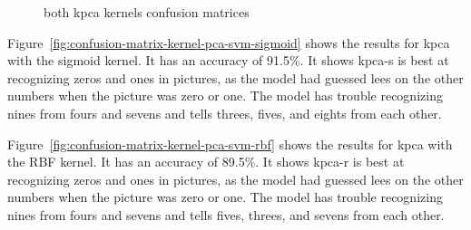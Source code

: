 \begin{figure}
    \centering
    \qquad
    \caption{both \gls{kpca} kernels confusion matrices}
    \label{fig:kpca-kernels}
\end{figure}

Figure~\ref{fig:confusion-matrix-kernel-pca-svm-sigmoid} shows the results for \gls{kpca} with the sigmoid kernel. It has an accuracy of 91.5\%. It shows \gls{kpca-s} is best at recognizing zeros and ones in pictures, as the model had guessed lees on the other numbers when the picture was zero or one. The model has trouble recognizing nines from fours and sevens and tells threes, fives, and eights from each other.

Figure~\ref{fig:confusion-matrix-kernel-pca-svm-rbf} shows the results for \gls{kpca} with the RBF kernel. It has an accuracy of 89.5\%. It shows \gls{kpca-r} is best at recognizing zeros and ones in pictures, as the model had guessed lees on the other numbers when the picture was zero or one. The model has trouble recognizing nines from fours and sevens and tells fives, threes, and sevens from each other.

